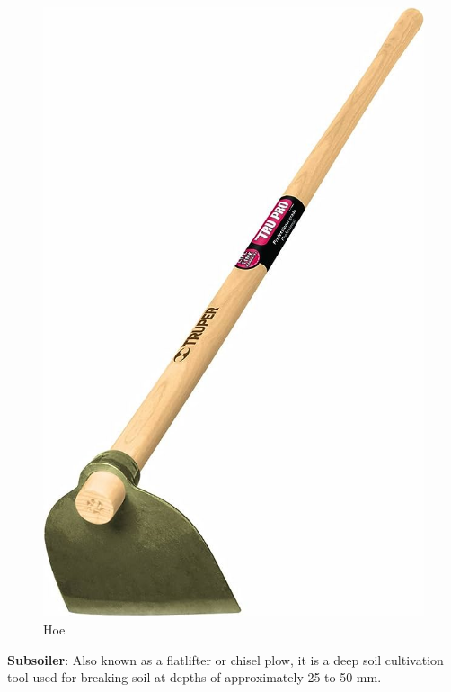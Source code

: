 \documentclass{article}
\begin{document}
\begin{flushleft}
\begin{center}
    \begin{figure}[h!]
        \centering
    \includegraphics[scale=0.1]{cultivating_tool/hoe.jpg}
    \caption{Hoe}
    \end{figure}
    \end{center}


\vspace*{3pt}
\textbf{Subsoiler}: Also known as a flatlifter or chisel plow, it is a deep soil cultivation tool used for breaking soil at depths of approximately 25 to 50 mm.


\end{flushleft}
\end{document}
